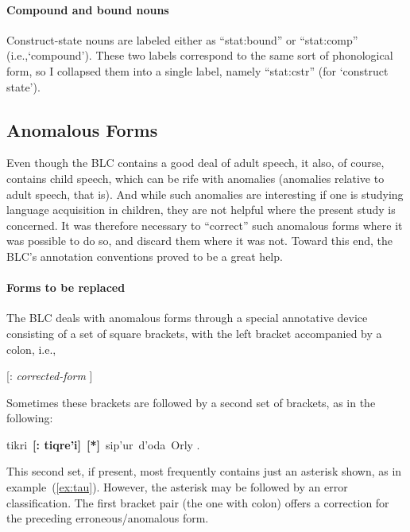 \paragraph{Compound and bound nouns}
Construct-state nouns are labeled either as ``\textsf{stat:bound}'' 
or ``\textsf{stat:comp}'' (i.e.,`compound'). 
These two labels correspond to the same sort of phonological form, 
 so I collapsed them into a single label, namely 
``\textsf{stat:cstr}'' (for `construct state').

\subsection{Anomalous Forms}\label{sec:anomolous}

Even though the \ac{BLC} contains a good deal of adult speech, it also, 
of course, contains child speech, which  
can be rife with anomalies (anomalies relative to adult speech, that is). 
And while such anomalies are interesting if one is studying language acquisition 
in children, they are not helpful where the present study is concerned. It 
was therefore necessary to ``correct'' such anomalous forms where it was 
possible to do so, and discard them where it was not. Toward this end, 
the \ac{BLC}'s annotation conventions proved to be a great help.

\paragraph{Forms to be replaced}
The \ac{BLC} deals with anomalous forms through a special 
annotative device consisting of a set of square brackets, with the left bracket 
accompanied
by a colon, i.e., 
\begin{center}
\textsf{[: \textit{corrected-form} ]}
\end{center}
Sometimes these brackets 
are followed by a second set of brackets, as in the following:
\begin{exe} \label{ex:tau}
\ex \textsf{tikri \,\textbf{[: tiqre\a'{i}]}\, \textbf{[*]}\, sip\a'{u}r\, d\a'{o}da\, Orly .}
\end{exe}
This second set, if present, most frequently contains just an asterisk shown, as in example~(\ref{ex:tau}). However,
the asterisk may be followed
by an error classification. The first bracket pair (the one with colon) offers a correction for the preceding erroneous/anomalous form.


